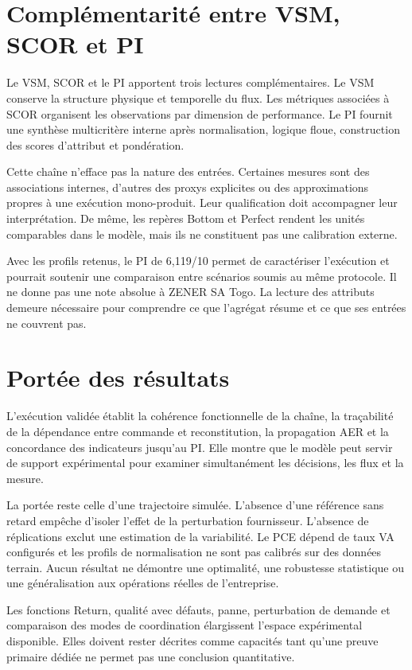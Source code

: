 \section{Complémentarité entre VSM, SCOR et PI}

Le VSM, SCOR et le PI apportent trois lectures complémentaires. Le VSM conserve la structure physique et temporelle du flux. Les métriques associées à SCOR organisent les observations par dimension de performance. Le PI fournit une synthèse multicritère interne après normalisation, logique floue, construction des scores d'attribut et pondération.

Cette chaîne n'efface pas la nature des entrées. Certaines mesures sont des associations internes, d'autres des proxys explicites ou des approximations propres à une exécution mono-produit. Leur qualification doit accompagner leur interprétation. De même, les repères Bottom et Perfect rendent les unités comparables dans le modèle, mais ils ne constituent pas une calibration externe.

Avec les profils retenus, le PI de 6,119/10 permet de caractériser l'exécution et pourrait soutenir une comparaison entre scénarios soumis au même protocole. Il ne donne pas une note absolue à ZENER SA Togo. La lecture des attributs demeure nécessaire pour comprendre ce que l'agrégat résume et ce que ses entrées ne couvrent pas.

\section{Portée des résultats}

L'exécution validée établit la cohérence fonctionnelle de la chaîne, la traçabilité de la dépendance entre commande et reconstitution, la propagation AER et la concordance des indicateurs jusqu'au PI. Elle montre que le modèle peut servir de support expérimental pour examiner simultanément les décisions, les flux et la mesure.

La portée reste celle d'une trajectoire simulée. L'absence d'une référence sans retard empêche d'isoler l'effet de la perturbation fournisseur. L'absence de réplications exclut une estimation de la variabilité. Le PCE dépend de taux VA configurés et les profils de normalisation ne sont pas calibrés sur des données terrain. Aucun résultat ne démontre une optimalité, une robustesse statistique ou une généralisation aux opérations réelles de l'entreprise.

Les fonctions Return, qualité avec défauts, panne, perturbation de demande et comparaison des modes de coordination élargissent l'espace expérimental disponible. Elles doivent rester décrites comme capacités tant qu'une preuve primaire dédiée ne permet pas une conclusion quantitative.

